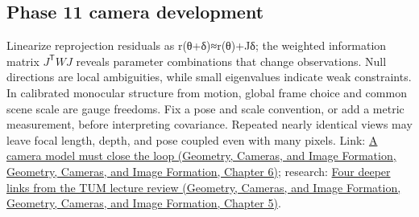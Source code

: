 \subsection{Phase 11 camera development}\label{appendix-3ee9861904d5-phase-11-camera-development}

Linearize reprojection residuals as r(θ+δ)≈r(θ)+Jδ; the weighted information matrix \(J^{\mathsf T}WJ\) reveals parameter combinations that change observations. Null directions are local ambiguities, while small eigenvalues indicate weak constraints. In calibrated monocular structure from motion, global frame choice and common scene scale are gauge freedoms. Fix a pose and scale convention, or add a metric measurement, before interpreting covariance. Repeated nearly identical views may leave focal length, depth, and pose coupled even with many pixels. Link: \href{../03-Geometry-Cameras-and-Image-Formation/main.pdf\#nameddest=02-foundations-ii-ch037-a-camera-model-must-close-the-loop}{A camera model must close the loop (Geometry, Cameras, and Image Formation, Geometry, Cameras, and Image Formation, Chapter 6)}; research: \href{../03-Geometry-Cameras-and-Image-Formation/main.pdf\#nameddest=02-foundations-ii-ch036-four-deeper-links-from-the-tum-lecture-review}{Four deeper links from the TUM lecture review (Geometry, Cameras, and Image Formation, Geometry, Cameras, and Image Formation, Chapter 5)}.
